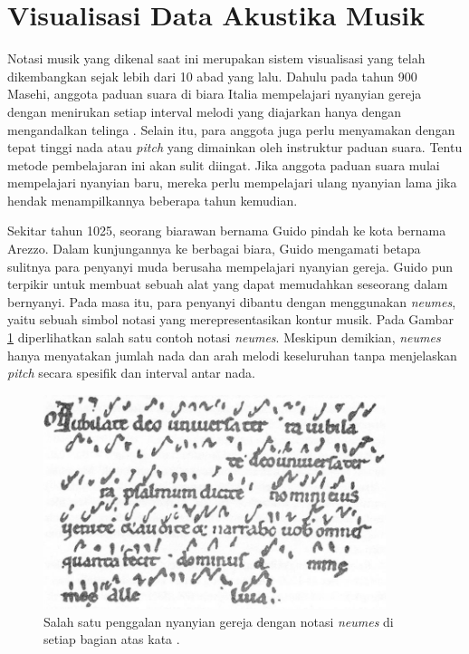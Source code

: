 
\section{Visualisasi Data Akustika Musik}
Notasi musik yang dikenal saat ini merupakan sistem visualisasi yang telah dikembangkan sejak lebih dari 10 abad yang lalu. Dahulu pada tahun 900 Masehi, anggota paduan suara di biara Italia mempelajari nyanyian gereja dengan menirukan setiap interval melodi yang diajarkan hanya dengan mengandalkan telinga \cite{GuidoArezzo}. Selain itu, para anggota juga perlu menyamakan dengan tepat tinggi nada atau \textit{pitch} yang dimainkan oleh instruktur paduan suara. Tentu metode pembelajaran ini akan sulit diingat. Jika anggota paduan suara mulai mempelajari nyanyian baru, mereka perlu mempelajari ulang nyanyian lama jika hendak menampilkannya beberapa tahun kemudian. \par 
Sekitar tahun 1025, seorang biarawan bernama Guido pindah ke kota bernama Arezzo. Dalam kunjungannya ke berbagai biara, Guido mengamati betapa sulitnya para penyanyi muda berusaha mempelajari nyanyian gereja. Guido pun terpikir untuk membuat sebuah alat yang dapat memudahkan seseorang dalam bernyanyi. Pada masa itu, para penyanyi dibantu dengan menggunakan \textit{neumes}, yaitu sebuah simbol notasi yang merepresentasikan kontur musik. Pada Gambar \ref{fig:neumes} diperlihatkan salah satu contoh notasi \textit{neumes}. Meskipun demikian, \textit{neumes} hanya menyatakan jumlah nada dan arah melodi keseluruhan tanpa menjelaskan \textit{pitch} secara spesifik dan interval antar nada. \par 
\begin{figure}[t!]
    \centering
    \includegraphics[width=10cm]{Gambar/Neume2.jpg}
    \caption{Salah satu penggalan nyanyian gereja dengan notasi \textit{neumes} di setiap bagian atas kata \cite{WQXR}.}
    \label{fig:neumes}
\end{figure}
